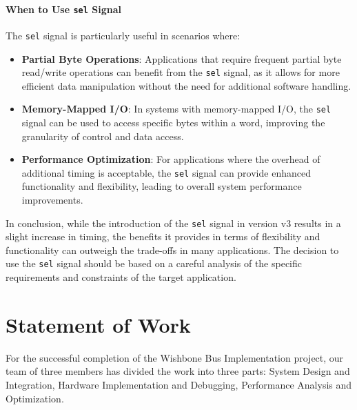 \documentclass[12pt]{report}
\begin{document}
\paragraph{When to Use \texttt{sel} Signal}
The \texttt{sel} signal is particularly useful in scenarios where:
\begin{itemize}
    \item \textbf{Partial Byte Operations}: Applications that require frequent partial byte read/write operations can benefit from the \texttt{sel} signal, as it allows for more efficient data manipulation without the need for additional software handling.
    \item \textbf{Memory-Mapped I/O}: In systems with memory-mapped I/O, the \texttt{sel} signal can be used to access specific bytes within a word, improving the granularity of control and data access.
    \item \textbf{Performance Optimization}: For applications where the overhead of additional timing is acceptable, the \texttt{sel} signal can provide enhanced functionality and flexibility, leading to overall system performance improvements.
\end{itemize}

In conclusion, while the introduction of the \texttt{sel} signal in version v3 results in a slight increase in timing, the benefits it provides in terms of flexibility and functionality can outweigh the trade-offs in many applications. The decision to use the \texttt{sel} signal should be based on a careful analysis of the specific requirements and constraints of the target application.




\section{Statement of Work}
For the successful completion of the Wishbone Bus Implementation project, our team of three members has divided the work into three parts: System Design and Integration, Hardware Implementation and Debugging, Performance Analysis and Optimization.
\end{document}
